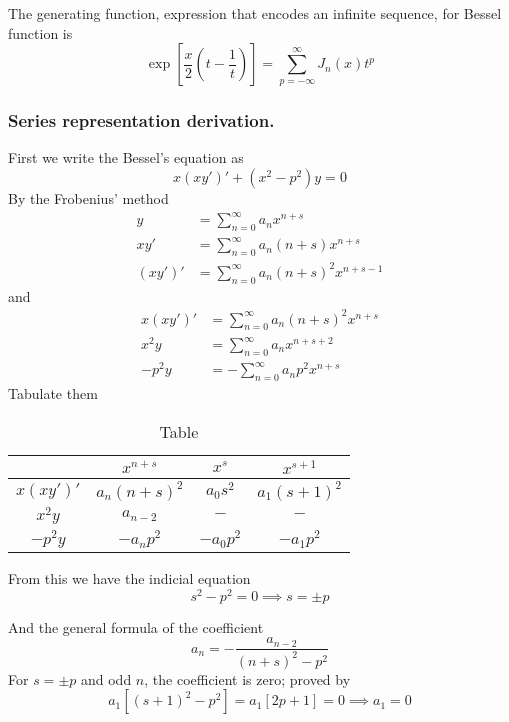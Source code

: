 \documentclass[../main.tex]{subfiles}
\begin{document}
The generating function, expression that encodes an infinite sequence, for Bessel function is 
\begin{equation*}
    \exp\left[\frac{x}{2}\left(t-\frac{1}{t}\right)\right] =\sum_{p=-\infty}^{\infty}J_n(x)t^p
\end{equation*}

\subsubsection*{Series representation derivation.} First we write the Bessel's equation as 
\begin{equation*}
    x(xy')'+ (x^2-p^2)y=0
\end{equation*}
By the Frobenius' method
\begin{align*}
    y&=\sum_{n=0}^{\infty} a_nx^{n+s}\\
    xy'&=\sum_{n=0}^{\infty} a_n(n+s) x^{n+s}\\
    (xy')'&=\sum_{n=0}^{\infty} a_n(n+s)^2 x^{n+s-1}
\end{align*}
and 
\begin{align*}
    x(xy')'&=\sum_{n=0}^{\infty} a_n(n+s)^2 x^{n+s}\\
    x^2y&=\sum_{n=0}^{\infty} a_n x^{n+s+2}\\
    -p^2y&=-\sum_{n=0}^{\infty} a_np^2x^{n+s}
\end{align*}
Tabulate them

\begin{table}[h]
    \centering
    \caption{Table}
    \begin{tabular}{cccc } 
        \toprule
        &$x^{n+s}$&$x^s$&$x^{s+1}$\\
        \midrule
        $x(xy')'$ & $a_n(n+s)^2 $ & $a_0s^2$ &$a_1(s+1)^2$\\
        $x^2y $&$a_{n-2}$&$- $&$-$\\
        $-p^2y$ &$-a_np^2$&$-a_0p^2$&$-a_1p^2$\\
        \bottomrule
    \end{tabular}
\end{table}

From this we have the indicial equation
\begin{equation*}
    s^2-p^2=0\implies s=\pm p
\end{equation*}

And the general formula of the coefficient
\begin{equation*}
    a_n=-\frac{a_{n-2}}{(n+s)^2-p^2}
\end{equation*}
For $s=\pm p$ and odd $n$, the coefficient is zero; proved by 
\begin{equation*}
    a_1\left[(s+1)^2-p^2\right]=a_1\left[2p+1\right]=0\implies a_1=0 
\end{equation*} 
\end{document}
